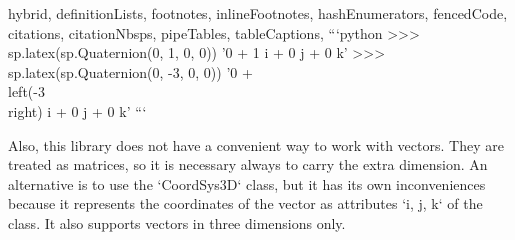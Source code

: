 \begin{markdown*}{%
  hybrid,
  definitionLists,
  footnotes,
  inlineFootnotes,
  hashEnumerators,
  fencedCode,
  citations,
  citationNbsps,
  pipeTables,
  tableCaptions,
}
```python
>>> sp.latex(sp.Quaternion(0, 1, 0, 0))
'0 + 1 i + 0 j + 0 k'
>>> sp.latex(sp.Quaternion(0, -3, 0, 0))
'0 + \\left(-3\\right) i + 0 j + 0 k'
```

Also, this library does not have a convenient way to work with vectors. They are treated as matrices, so it is necessary always to carry the extra dimension. An alternative is to use the `CoordSys3D` class, but it has its own inconveniences because it represents the coordinates of the vector as attributes `i, j, k` of the class. It also supports vectors in three dimensions only.

\end{markdown*}
\shorthandon{-}